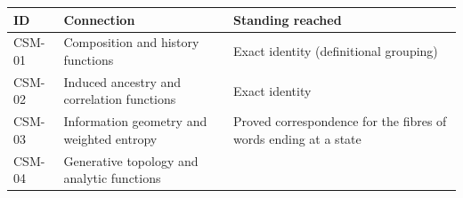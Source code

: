 \documentclass[
  11pt,
]{article}
\begin{document}
\begin{longtable}[]{@{}lll@{}}
\toprule
\begin{minipage}[b]{0.14\columnwidth}\raggedright
ID\strut
\end{minipage} & \begin{minipage}[b]{0.34\columnwidth}\raggedright
Connection\strut
\end{minipage} & \begin{minipage}[b]{0.43\columnwidth}\raggedright
Standing reached\strut
\end{minipage}\tabularnewline
\midrule
\endhead
\begin{minipage}[t]{0.14\columnwidth}\raggedright
CSM-01\strut
\end{minipage} & \begin{minipage}[t]{0.34\columnwidth}\raggedright
Composition and history functions\strut
\end{minipage} & \begin{minipage}[t]{0.43\columnwidth}\raggedright
Exact identity (definitional grouping)\strut
\end{minipage}\tabularnewline
\begin{minipage}[t]{0.14\columnwidth}\raggedright
CSM-02\strut
\end{minipage} & \begin{minipage}[t]{0.34\columnwidth}\raggedright
Induced ancestry and correlation functions\strut
\end{minipage} & \begin{minipage}[t]{0.43\columnwidth}\raggedright
Exact identity\strut
\end{minipage}\tabularnewline
\begin{minipage}[t]{0.14\columnwidth}\raggedright
CSM-03\strut
\end{minipage} & \begin{minipage}[t]{0.34\columnwidth}\raggedright
Information geometry and weighted entropy\strut
\end{minipage} & \begin{minipage}[t]{0.43\columnwidth}\raggedright
Proved correspondence for the fibres of words ending at a state\strut
\end{minipage}\tabularnewline
\begin{minipage}[t]{0.14\columnwidth}\raggedright
CSM-04\strut
\end{minipage} & \begin{minipage}[t]{0.34\columnwidth}\raggedright
Generative topology and analytic functions\strut
\end{minipage} & \begin{minipage}[t]{0.43\columnwidth}\raggedright

\end{minipage}
\end{longtable}
\end{document}
